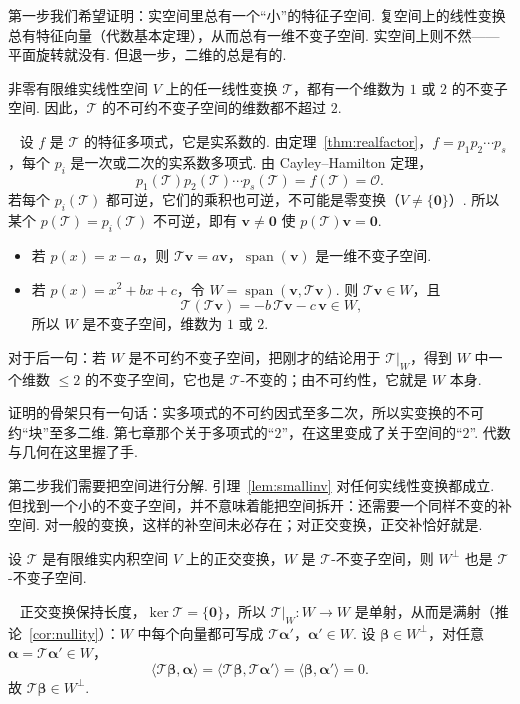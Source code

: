 \documentclass[lang=cn,10.5pt,scheme=chinese,toc=twocol,section,chinesefont=nofont,
twoside,citestyle=gb7714-2015,bibstyle=gb7714-2015]{elegantbook}
\DeclareRobustCommand{\textbf}[1]{{\lnsemiboldlatin\lnsemiboldcjk #1}}
\newcommand{\vv}[1]{\boldsymbol{#1}}
\newcommand{\zero}{\boldsymbol{0}}          %
\numberwithin{equation}{section}   %
\newcommand{\spn}{\operatorname{span}}      %
\newcommand*{\lnlabel}[1]{{\sffamily\bfseries\color{black}#1}}
\renewenvironment{proof}{%
	\par\noindent\lnlabel{\proofname}\;\ \color{black!90}\cfs}{\par}
\begin{document}
第一步我们希望证明：实空间里总有一个“小”的特征子空间. 复空间上的线性变换总有特征向量（代数基本定理），从而总有一维不变子空间. 实空间上则不然——平面旋转就没有. 但退一步，二维的总是有的.

\begin{lemma}
  \label{lem:smallinv}
  非零有限维实线性空间 $V$ 上的任一线性变换 $\mathscr T$，都有一个维数为 $1$ 或 $2$ 的不变子空间. 因此，$\mathscr T$ 的不可约不变子空间的维数都不超过 $2$.
\end{lemma}
\begin{proof}
  设 $f$ 是 $\mathscr T$ 的特征多项式，它是实系数的. 由定理~\ref{thm:realfactor}，$f=p_1p_2\cdots p_s$，每个 $p_i$ 是一次或二次的实系数多项式. 由 Cayley–Hamilton 定理，
  \[p_1(\mathscr T)p_2(\mathscr T)\cdots p_s(\mathscr T)=f(\mathscr T)=\mathscr O.\]
  若每个 $p_i(\mathscr T)$ 都可逆，它们的乘积也可逆，不可能是零变换（$V\ne\{\zero\}$）. 所以某个 $p(\mathscr T)=p_i(\mathscr T)$ 不可逆，即有 $\vv v\ne\zero$ 使 $p(\mathscr T)\vv v=\zero$.
  \begin{itemize}
    \item 若 $p(x)=x-a$，则 $\mathscr T\vv v=a\vv v$，$\spn(\vv v)$ 是一维不变子空间.
    \item 若 $p(x)=x^2+bx+c$，令 $W=\spn(\vv v,\mathscr T\vv v)$. 则 $\mathscr T\vv v\in W$，且
          \[\mathscr T(\mathscr T\vv v)=-b\,\mathscr T\vv v-c\,\vv v\in W,\]
          所以 $W$ 是不变子空间，维数为 $1$ 或 $2$.
  \end{itemize}
  对于后一句：若 $W$ 是不可约不变子空间，把刚才的结论用于 $\mathscr T|_W$，得到 $W$ 中一个维数 $\le2$ 的不变子空间，它也是 $\mathscr T$-不变的；由不可约性，它就是 $W$ 本身.
\end{proof}

\begin{motivebox}
  证明的骨架只有一句话：\textbf{实多项式的不可约因式至多二次，所以实变换的不可约“块”至多二维.} 第七章那个关于多项式的“$2$”，在这里变成了关于空间的“$2$”. 代数与几何在这里握了手.
\end{motivebox}

第二步我们需要把空间进行分解. 引理~\ref{lem:smallinv} 对任何实线性变换都成立. 但找到一个小的不变子空间，并不意味着能把空间拆开：还需要一个\textbf{同样不变}的补空间. 对一般的变换，这样的补空间未必存在；对正交变换，正交补恰好就是.

\begin{lemma}
  \label{lem:orthinvperp}
  设 $\mathscr T$ 是有限维实内积空间 $V$ 上的正交变换，$W$ 是 $\mathscr T$-不变子空间，则 $W^\perp$ 也是 $\mathscr T$-不变子空间.
\end{lemma}
\begin{proof}
  正交变换保持长度，$\ker\mathscr T=\{\zero\}$，所以 $\mathscr T|_W:W\to W$ 是单射，从而是满射（推论~\ref{cor:nullity}）：$W$ 中每个向量都可写成 $\mathscr T\vv\alpha'$，$\vv\alpha'\in W$. 设 $\vv\beta\in W^\perp$，对任意 $\vv\alpha=\mathscr T\vv\alpha'\in W$，
  \[\langle\mathscr T\vv\beta,\vv\alpha\rangle=\langle\mathscr T\vv\beta,\mathscr T\vv\alpha'\rangle=\langle\vv\beta,\vv\alpha'\rangle=0.\]
  故 $\mathscr T\vv\beta\in W^\perp$.
\end{proof}
\end{document}
